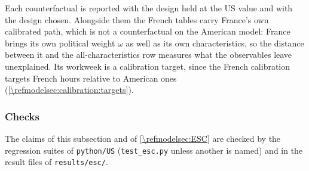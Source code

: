 Each counterfactual is reported with the design held at the US value and with the design chosen. Alongside them the French tables carry France's own calibrated path, which is not a counterfactual on the American model: France brings its own political weight $\omega$ as well as its own characteristics, so the distance between it and the all-characteristics row measures what the observables leave unexplained. Its workweek is a calibration target, since the French calibration targets French hours relative to American ones (\cref{\refmodelsec:calibration:targets}).


\subsubsection{Checks}\label{\refsec:ESC:checks}
The claims of this subsection and of \cref{\refmodelsec:ESC} are checked by the regression suites of \texttt{python/US} (\texttt{test\_esc.py} unless another is named) and in the result files of \texttt{results/esc/}.
